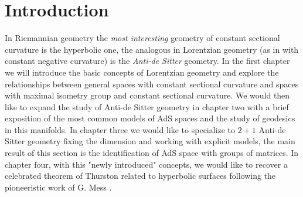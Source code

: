 \chapter*{Introduction}
In Riemannian geometry the \textit{most interesting} geometry of constant sectional curvature is the hyperbolic one, the analogous in Lorentzian geometry  (as in with constant negative curvature) is the \textit{Anti-de Sitter} geometry. In the first chapter we will introduce the basic concepts of Lorentzian geometry and explore the relationships between general spaces with constant sectional curvature and spaces with maximal isometry group and constant sectional curvature.
We would then like to expand the study of Anti-de Sitter geometry in chapter two with a brief exposition of the most common models of AdS spaces and the study of geodesics in this manifolds. 
In chapter three we would like to specialize to $2+1$ Anti-de Sitter geometry fixing the dimension and working with explicit models, the main result of this section is the identification of AdS space with groups of matrices. 
In chapter four, with this "newly introduced" concepts, we would like to recover a celebrated theorem of Thurston related to hyperbolic surfaces following the pioneeristic work of G. Mess \cite{Mess}.